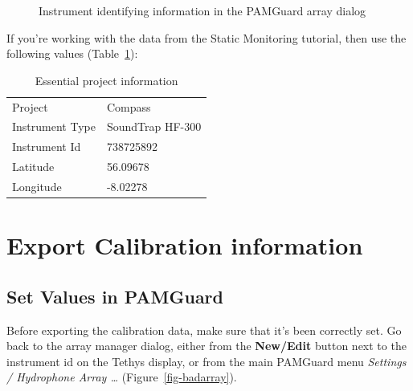 \documentclass[
]{article}
\begin{document}
\begin{figure}


\caption{\label{fig-instrument}Instrument identifying information in the
PAMGuard array dialog}

\end{figure}%

If you're working with the data from the Static Monitoring tutorial,
then use the following values (Table~\ref{tbl-identify}):

\begin{longtable}[]{@{}ll@{}}
\caption{Essential project
information}\label{tbl-identify}\tabularnewline
\toprule\noalign{}
\endfirsthead
\endhead
\bottomrule\noalign{}
\endlastfoot
Project & Compass \\
Instrument Type & SoundTrap HF-300 \\
Instrument Id & 738725892 \\
Latitude & 56.09678 \\
Longitude & -8.02278 \\
\end{longtable}

\section{Export Calibration
information}\label{export-calibration-information}

\subsection{Set Values in PAMGuard}\label{set-values-in-pamguard}

Before exporting the calibration data, make sure that it's been
correctly set. Go back to the array manager dialog, either from the
\textbf{New/Edit} button next to the instrument id on the Tethys
display, or from the main PAMGuard menu \emph{Settings / Hydrophone
Array \ldots{}} (Figure~\ref{fig-badarray}).
\end{document}
